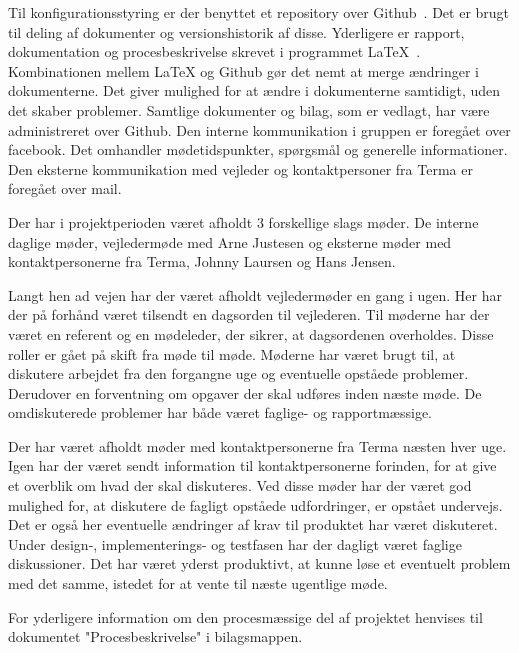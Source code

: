 Til konfigurationsstyring er der benyttet et repository over Github~\cite{Github}. Det er brugt til deling af dokumenter og versionshistorik af disse. Yderligere er rapport, dokumentation og procesbeskrivelse skrevet i programmet LaTeX~\cite{Latex}. Kombinationen mellem LaTeX og Github gør det nemt at merge ændringer i dokumenterne. Det giver mulighed for at ændre i dokumenterne samtidigt, uden det skaber problemer. Samtlige dokumenter og bilag, som er vedlagt, har være administreret over Github.
Den interne kommunikation i gruppen er foregået over facebook. Det omhandler mødetidspunkter, spørgsmål og generelle informationer. Den eksterne kommunikation med vejleder og kontaktpersoner fra Terma er foregået over mail.  

Der har i projektperioden været afholdt 3 forskellige slags møder. De interne daglige møder, vejledermøde med Arne Justesen og eksterne møder med kontaktpersonerne fra Terma, Johnny Laursen og Hans Jensen. 

Langt hen ad vejen har der været afholdt vejledermøder en gang i ugen. Her har der på forhånd været tilsendt en dagsorden til vejlederen. Til møderne har der været en referent og en mødeleder, der sikrer, at dagsordenen overholdes. Disse roller er gået på skift fra møde til møde. Møderne har været brugt til, at diskutere arbejdet fra den forgangne uge og eventuelle opståede problemer. Derudover en forventning om opgaver der skal udføres inden næste møde. De omdiskuterede problemer har både været faglige- og rapportmæssige. 

Der har været afholdt møder med kontaktpersonerne fra Terma næsten hver uge. Igen har der været sendt information til kontaktpersonerne forinden, for at give et overblik om hvad der skal diskuteres. Ved disse møder har der været god mulighed for, at diskutere de fagligt opståede udfordringer, er opstået undervejs. Det er også her eventuelle ændringer af krav til produktet har været diskuteret. Under design-, implementerings- og testfasen har der dagligt været faglige diskussioner. Det har været yderst produktivt, at kunne løse et eventuelt problem med det samme, istedet for at vente til næste ugentlige møde. 

For yderligere information om den procesmæssige del af projektet henvises til dokumentet "Procesbeskrivelse" i bilagsmappen.  